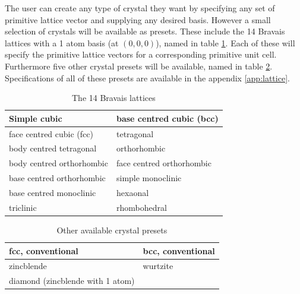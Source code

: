 \documentclass[main.tex]{subfiles}
\begin{document}
	The user can create any type of crystal they want by specifying any set of primitive lattice vector and supplying any desired basis. However a small selection of crystals will be available as presets. These include the 14 Bravais lattices with a 1 atom basis (at $ (0,0,0) $), named in table \ref{tab:bravais}. Each of these will specify the primitive lattice vectors for a corresponding primitive unit cell. Furthermore five other crystal presets will be available, named in table \ref{tab:presets}. Specifications of all of these presets are available in the appendix \ref{app:lattice}.
	\begin{table}[H]
		\centering
		\begin{tabular}{|l|l|}
			\hline
			Simple cubic & base centred cubic (bcc) \\
			\hline
			face centred cubic (fcc) & tetragonal \\
			\hline
			body centred tetragonal & orthorhombic \\
			\hline
			body centred orthorhombic & face centred orthorhombic \\
			\hline
			base centred orthorhombic & simple monoclinic \\
			\hline
			base centred monoclinic & hexaonal \\
			\hline
			triclinic & rhombohedral \\
			\hline
		\end{tabular}
		\caption{The 14 Bravais lattices}
		\label{tab:bravais}
	\end{table}
	\begin{table}[H]
		\centering
		\begin{tabular}{|l|l|}
			\hline
			fcc, conventional & bcc, conventional \\
			\hline
			zincblende & wurtzite \\
			\hline
			diamond (zincblende with 1 atom) & \\
			\hline
		\end{tabular}
		\caption{Other available crystal presets}
		\label{tab:presets}
	\end{table}
	
\end{document}
